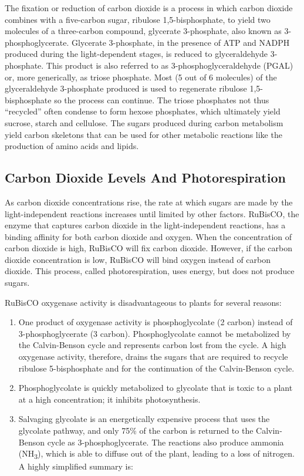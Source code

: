 The fixation or reduction of carbon dioxide is a process in which carbon dioxide combines with a five-carbon sugar, ribulose 1,5-bisphosphate, to yield two molecules of a three-carbon compound, glycerate 3-phosphate, also known as 3-phosphoglycerate. Glycerate 3-phosphate, in the presence of ATP and NADPH produced during the light-dependent stages, is reduced to glyceraldehyde 3-phosphate. This product is also referred to as 3-phosphoglyceraldehyde (PGAL) or, more generically, as triose phosphate. Most (5 out of 6 molecules) of the glyceraldehyde 3-phosphate produced is used to regenerate ribulose 1,5-bisphosphate so the process can continue. The triose phosphates not thus ``recycled'' often condense to form hexose phosphates, which ultimately yield sucrose, starch and cellulose. The sugars produced during carbon metabolism yield carbon skeletons that can be used for other metabolic reactions like the production of amino acids and lipids.

\hypertarget{carbon-dioxide-levels-and-photorespiration}{%
\subsection{Carbon Dioxide Levels And Photorespiration}\label{carbon-dioxide-levels-and-photorespiration}}

As carbon dioxide concentrations rise, the rate at which sugars are made by the light-independent reactions increases until limited by other factors. RuBisCO, the enzyme that captures carbon dioxide in the light-independent reactions, has a binding affinity for both carbon dioxide and oxygen. When the concentration of carbon dioxide is high, RuBisCO will fix carbon dioxide. However, if the carbon dioxide concentration is low, RuBisCO will bind oxygen instead of carbon dioxide. This process, called photorespiration, uses energy, but does not produce sugars.

RuBisCO oxygenase activity is disadvantageous to plants for several reasons:

\begin{enumerate}
\def\labelenumi{\arabic{enumi}.}
\tightlist
\item
  One product of oxygenase activity is phosphoglycolate (2 carbon) instead of 3-phosphoglycerate (3 carbon). Phosphoglycolate cannot be metabolized by the Calvin-Benson cycle and represents carbon lost from the cycle. A high oxygenase activity, therefore, drains the sugars that are required to recycle ribulose 5-bisphosphate and for the continuation of the Calvin-Benson cycle.
\item
  Phosphoglycolate is quickly metabolized to glycolate that is toxic to a plant at a high concentration; it inhibits photosynthesis.
\item
  Salvaging glycolate is an energetically expensive process that uses the glycolate pathway, and only 75\% of the carbon is returned to the Calvin-Benson cycle as 3-phosphoglycerate. The reactions also produce ammonia (NH\textsubscript{3}), which is able to diffuse out of the plant, leading to a loss of nitrogen.
  A highly simplified summary is:
\end{enumerate}

